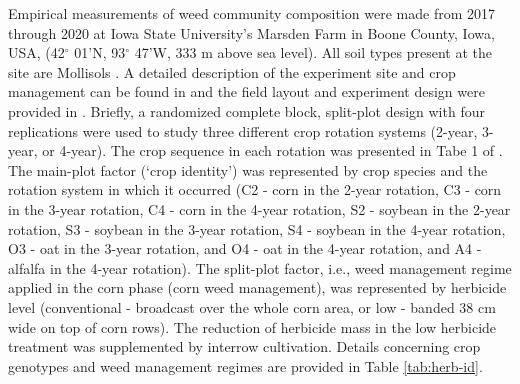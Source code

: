 \documentclass[
]{article}
\author{}
\date{\vspace{-2.5em}}
\begin{document}
Empirical measurements of weed community composition were made from 2017 through 2020 at Iowa State University's Marsden Farm in Boone County, Iowa, USA, (42\(^\circ\) 01'N, 93\(^\circ\) 47'W, 333 m above sea level). All soil types present at the site are Mollisols \citep{chenInfluenceResidueNitrogen2014}. A detailed description of the experiment site and crop management can be found in \citet{liebmanWeedSeedbankDiversity2021} and the field layout and experiment design were provided in \citet{nguyenImpactCroppingSysteminreview}. Briefly, a randomized complete block, split-plot design with four replications were used to study three different crop rotation systems (2-year, 3-year, or 4-year). The crop sequence in each rotation was presented in Tabe 1 of \citet{nguyenImpactCroppingSysteminreview}. The main-plot factor (`crop identity') was represented by crop species and the rotation system in which it occurred (C2 - corn in the 2-year rotation, C3 - corn in the 3-year rotation, C4 - corn in the 4-year rotation, S2 - soybean in the 2-year rotation, S3 - soybean in the 3-year rotation, S4 - soybean in the 4-year rotation, O3 - oat in the 3-year rotation, and O4 - oat in the 4-year rotation, and A4 - alfalfa in the 4-year rotation). The split-plot factor, i.e., weed management regime applied in the corn phase (corn weed management), was represented by herbicide level (conventional - broadcast over the whole corn area, or low - banded 38 cm wide on top of corn rows). The reduction of herbicide mass in the low herbicide treatment was supplemented by interrow cultivation. Details concerning crop genotypes and weed management regimes are provided in Table \ref{tab:herb-id}.
\end{document}
